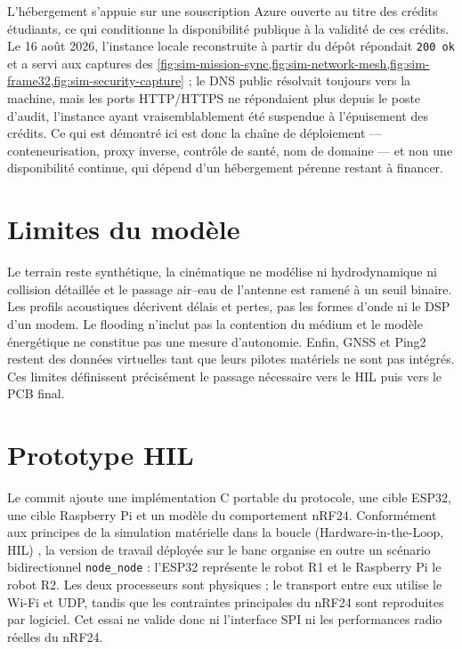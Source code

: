 L'hébergement s'appuie sur une souscription Azure ouverte au titre des crédits étudiants, ce qui conditionne la disponibilité publique à la validité de ces crédits. Le 16 août 2026, l'instance locale reconstruite à partir du dépôt répondait \texttt{200 ok} et a servi aux captures des \cref{fig:sim-mission-sync,fig:sim-network-mesh,fig:sim-frame32,fig:sim-security-capture} ; le DNS public résolvait toujours vers la machine, mais les ports HTTP/HTTPS ne répondaient plus depuis le poste d'audit, l'instance ayant vraisemblablement été suspendue à l'épuisement des crédits. Ce qui est démontré ici est donc la chaîne de déploiement --- conteneurisation, proxy inverse, contrôle de santé, nom de domaine --- et non une disponibilité continue, qui dépend d'un hébergement pérenne restant à financer.

\section{Limites du modèle}

Le terrain reste synthétique, la cinématique ne modélise ni hydrodynamique ni collision détaillée et le passage air--eau de l'antenne est ramené à un seuil binaire. Les profils acoustiques décrivent délais et pertes, pas les formes d'onde ni le DSP d'un modem. Le flooding n'inclut pas la contention du médium et le modèle énergétique ne constitue pas une mesure d'autonomie. Enfin, GNSS et Ping2 restent des données virtuelles tant que leurs pilotes matériels ne sont pas intégrés. Ces limites définissent précisément le passage nécessaire vers le HIL puis vers le PCB final.

\section{Prototype HIL}

Le commit  ajoute une implémentation C portable du protocole, une cible ESP32, une cible Raspberry Pi et un modèle du comportement nRF24. Conformément aux principes de la simulation matérielle dans la boucle (Hardware-in-the-Loop, HIL) \cite{monti2017hil}, la version de travail déployée sur le banc organise en outre un scénario bidirectionnel \texttt{node\_node} : l'ESP32 représente le robot R1 et le Raspberry Pi le robot R2. Les deux processeurs sont physiques ; le transport entre eux utilise le Wi-Fi et UDP, tandis que les contraintes principales du nRF24 sont reproduites par logiciel. Cet essai ne valide donc ni l'interface SPI ni les performances radio réelles du nRF24.

